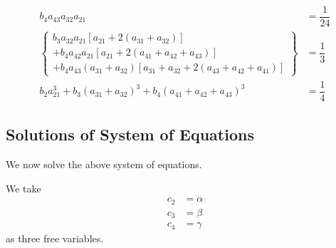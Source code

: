 \documentclass[a4paper,oneside]{book}
\numberwithin{equation}{chapter}
\begin{document}
\begin{align}
{b_4}{a_{43}}{a_{32}}{a_{21}} &= \dfrac{1}{{24}}\\
\left\{ \begin{array}{l}
{b_3}{a_{32}}{a_{21}}\left[ {{a_{21}} + 2\left( {{a_{31}} + {a_{32}}} \right)} \right]\\
 + {b_4}{a_{42}}{a_{21}}\left[ {{a_{21}} + 2\left( {{a_{41}} + {a_{42}} + {a_{43}}} \right)} \right]\\
 + {b_4}{a_{43}}\left( {{a_{31}} + {a_{32}}} \right)\left[ {{a_{31}} + {a_{32}} + 2\left( {{a_{43}} + {a_{42}} + {a_{41}}} \right)} \right]
\end{array} \right\} &= \dfrac{1}{3}\\
{b_2}a_{21}^3 + {b_3}{\left( {{a_{31}} + {a_{32}}} \right)^3} + {b_4}{\left( {{a_{41}} + {a_{42}} + {a_{43}}} \right)^3} &= \dfrac{1}{4}\label{4.124}
\end{align}
\subsection{Solutions of System of Equations}
We now solve the above system of equations. 

We take 
\begin{align}
{c_2} &= \alpha \\
{c_3} &= \beta \\
{c_4} &= \gamma 
\end{align}
as three free variables.
\end{document}
